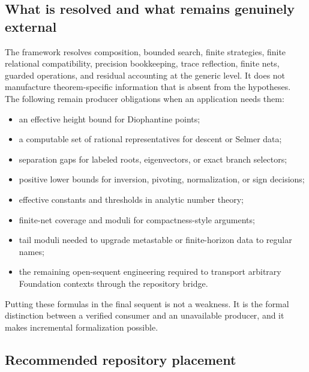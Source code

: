 \subsection{What is resolved and what remains genuinely external}

The framework resolves composition, bounded search, finite strategies, finite relational compatibility, precision bookkeeping, trace reflection, finite nets, guarded operations, and residual accounting at the generic level.  It does not manufacture theorem-specific information that is absent from the hypotheses.  The following remain producer obligations when an application needs them:
\begin{itemize}
  \item an effective height bound for Diophantine points;
  \item a computable set of rational representatives for descent or Selmer data;
  \item separation gaps for labeled roots, eigenvectors, or exact branch selectors;
  \item positive lower bounds for inversion, pivoting, normalization, or sign decisions;
  \item effective constants and thresholds in analytic number theory;
  \item finite-net coverage and moduli for compactness-style arguments;
  \item tail moduli needed to upgrade metastable or finite-horizon data to regular names;
  \item the remaining open-sequent engineering required to transport arbitrary Foundation contexts through the repository bridge.
\end{itemize}
Putting these formulas in the final sequent is not a weakness.  It is the formal distinction between a verified consumer and an unavailable producer, and it makes incremental formalization possible.

\subsection{Recommended repository placement}

